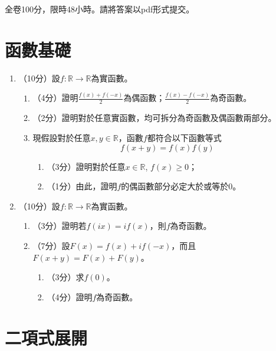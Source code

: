 \documentclass[12pt]{article}
\begin{document}
    全卷100分，限時48小時。請將答案以pdf形式提交。
    \section*{函數基礎}

    \begin{enumerate}
        \item （10分）設$f:\mathbb{R}\to\mathbb{R}$為實函數。\begin{enumerate}
            \item （4分）證明$\frac{f(x)+f(-x)}{2}$為偶函數；$\frac{f(x)-f(-x)}{2}$為奇函數。
            \item （2分）證明對於任意實函數，均可拆分為奇函數及偶函數兩部分。
            \item 現假設對於任意$x,y\in\mathbb{R}$，函數$f$都符合以下函數等式$$f(x+y)=f(x)f(y)$$\begin{enumerate}
                \item （3分）證明對於任意$x\in\mathbb{R}$, $f(x)\geq 0$；
                \item （1分）由此，證明$f$的偶函數部分必定大於或等於$0$。
            \end{enumerate}
        \end{enumerate}
        \item （10分）設$f:\mathbb{R}\to\mathbb{R}$為實函數。\begin{enumerate}
            \item （3分）證明若$f(ix)=if(x)$，則$f$為奇函數。
            \item （7分）設$F(x)=f(x)+if(-x)$，而且$F(x+y)=F(x)+F(y)$。\begin{enumerate}
                \item （3分）求$f(0)$。
                \item （4分）證明$f$為奇函數。
            \end{enumerate}
        \end{enumerate}
    \end{enumerate}

    

    \section*{二項式展開}
\end{document}
